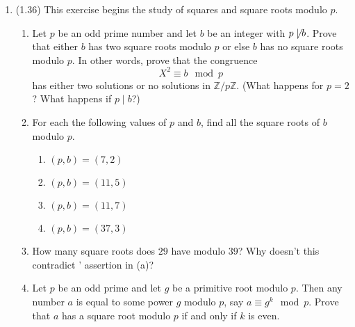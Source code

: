 \documentclass[12pt]{amsart}
\theoremstyle{definition}
\begin{document}
\begin{enumerate}
	\item (1.36) This exercise begins the study of squares and square roots modulo $p$. 
	\begin{enumerate}
		\item Let $p$ be an odd prime number and let $b$ be an integer with $p \not \mid b$. Prove 
			that either $b$ has two square roots modulo $p$ or else $b$ has no square roots 
			modulo $p$. In other words, prove that the congruence 
		\begin{displaymath}
			X^2 \equiv b \mod p
		\end{displaymath}
		has either two solutions or no solutions in $\mathbb{Z}/p\mathbb{Z}$. (What happens for $p=2$? 
		What happens if $p \mid b$?)
	
		\item For each the following values of $p$ and $b$, find all the square roots of $b$ 
			modulo $p$. 
		\begin{enumerate}
			\item $(p,b) = (7,2)$
			\item $(p,b) = (11,5)$
			\item $(p,b) = (11,7)$
			\item $(p,b) = (37,3)$
		\end{enumerate}
		
		\item How many square roots does $29$ have modulo $39$? Why doesn't this contradict '
			assertion in (a)? 

		\item Let $p$ be an odd prime and let $g$ be a primitive root modulo $p$. Then any 
			number $a$ is equal to some power $g$ modulo $p$, say $a \equiv g^k \mod p$. 
			Prove that $a$ has a square root modulo $p$ if and only if $k$ is even. 
	\end{enumerate}
		
\end{enumerate}
\end{document}
